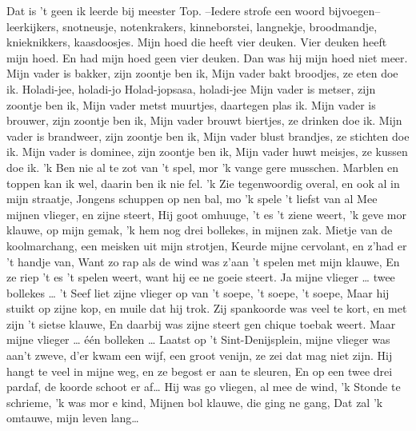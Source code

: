 \documentclass{article}
\begin{document}
\begin{songs}{}
Dat is 't geen ik leerde bij meester Top.
\endverse
\beginchorus
--Iedere strofe een woord bijvoegen--
leerkijkers, snotneusje, notenkrakers,
kinneborstei, langnekje,
broodmandje, knieknikkers, 
kaasdoosjes.
\endchorus
\endsong
{}
\beginverse*
Mijn hoed die heeft vier deuken.
Vier deuken heeft mijn hoed.
En had mijn hoed geen vier deuken.
Dan was hij mijn hoed niet meer.
\endverse
\endsong
{}
\beginverse
Mijn vader is bakker, zijn zoontje ben ik,
Mijn vader bakt broodjes, ze eten doe ik.
\endverse
\beginchorus
Holadi-jee, holadi-jo
Holad-jopsasa, holadi-jee 
\endchorus
\beginverse
Mijn vader is metser, zijn zoontje ben ik,
Mijn vader metst muurtjes, daartegen plas ik.
\endverse
\beginverse
Mijn vader is brouwer, zijn zoontje ben ik,
Mijn vader brouwt biertjes, ze drinken doe ik. 
\endverse
\beginverse
Mijn vader is brandweer, zijn zoontje ben ik, 
Mijn vader blust brandjes, ze stichten doe ik.
\endverse
\beginverse
Mijn vader is dominee, zijn zoontje ben ik,
Mijn vader huwt meisjes, ze kussen doe ik. 
\endverse
\endsong
{}
\beginverse*
'k Ben nie al te zot van 't spel, mor 'k vange gere musschen. 
Marblen en toppen kan ik wel, daarin ben ik nie fel.
'k Zie tegenwoordig overal, en ook al in mijn straatje,
Jongens schuppen op nen bal, mo 'k spele 't liefst van al
\endverse
\beginchorus
Mee mijnen vlieger, en zijne steert,
Hij goot omhuuge, 't es 't ziene weert,
'k geve mor klauwe, op mijn gemak,
'k hem nog drei bollekes, in mijnen zak. 
\endchorus
\beginverse*
Mietje van de koolmarchang, een meisken uit mijn strotjen,
Keurde mijne cervolant, en z’had er 't handje van,
Want zo rap als de wind was z’aan 't spelen met mijn klauwe,
En ze riep 't es 't spelen weert, want hij ee ne goeie steert. 
Ja mijne vlieger … twee bollekes … 
\endverse
\beginverse*
't Seef liet zijne vlieger op van 't soepe, 't soepe, 't soepe,
Maar hij stuikt op zijne kop, en muile dat hij trok. 
Zij spankoorde was veel te kort, en met zijn 't sietse klauwe, 
En daarbij was zijne steert gen chique toebak weert.
Maar mijne vlieger … één bolleken …
\endverse
\beginverse*
Laatst op 't Sint-Denijsplein, mijne vlieger was aan’t zweve,
d’er kwam een wijf, een groot venijn, ze zei dat mag niet zijn. 
Hij hangt te veel in mijne weg, en ze begost er aan te sleuren,
En op een twee drei pardaf, de koorde schoot er af…
\endverse
\beginchorus
Hij was go vliegen, al mee de wind,
'k Stonde te schrieme, 'k was mor e kind,
Mijnen bol klauwe, die ging ne gang,
Dat zal 'k omtauwe, mijn leven lang…  
\endchorus

\end{songs}
\end{document}
